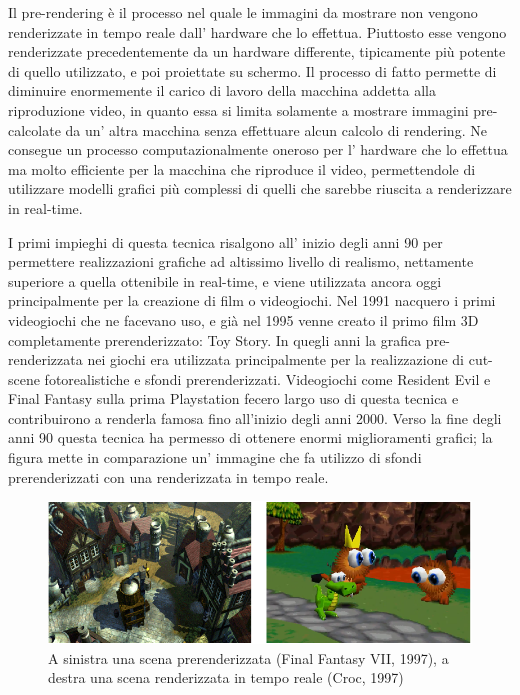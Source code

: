 Il pre-rendering è il processo nel quale le immagini da mostrare non vengono renderizzate in tempo reale dall’ hardware che lo effettua. Piuttosto esse vengono renderizzate precedentemente da un hardware differente, tipicamente più potente di quello utilizzato, e poi proiettate su schermo.
Il processo di fatto permette di diminuire enormemente il carico di lavoro della macchina addetta alla riproduzione video, in quanto essa si limita solamente a mostrare immagini pre-calcolate da un’ altra macchina senza effettuare alcun calcolo di rendering.
Ne consegue un processo computazionalmente oneroso per l’ hardware che lo effettua ma molto efficiente per la macchina che riproduce il video, permettendole di utilizzare modelli grafici più complessi di quelli che sarebbe riuscita a renderizzare in real-time.

I primi impieghi di questa tecnica risalgono all’ inizio degli anni 90 per permettere realizzazioni grafiche ad altissimo livello di realismo, nettamente superiore a quella ottenibile in real-time, e viene utilizzata ancora oggi principalmente per la creazione di film o videogiochi.
Nel 1991 nacquero i primi videogiochi che ne facevano uso, e già nel 1995 venne creato il primo film 3D completamente prerenderizzato: Toy Story.
In quegli anni la grafica pre-renderizzata nei giochi era utilizzata principalmente per la realizzazione di cut-scene fotorealistiche e sfondi prerenderizzati. 
Videogiochi come Resident Evil e Final Fantasy sulla prima Playstation fecero largo uso di questa tecnica e contribuirono a renderla famosa fino all’inizio degli anni 2000. 
Verso la fine degli anni 90 questa tecnica ha permesso di ottenere enormi miglioramenti grafici; la figura mette in comparazione un’ immagine che fa utilizzo di sfondi prerenderizzati con una renderizzata in tempo reale.
\\
\begin{figure}[htb]
 \centering
 \includegraphics[width=1\linewidth]{images/chapter_stato_arte/stato_arte_croc_ffvii.png}\hfill
 \caption[Confronto tra scena prerenderizzata e real time]{A sinistra una scena prerenderizzata (Final Fantasy VII, 1997), a destra una scena renderizzata in tempo reale (Croc, 1997)}
 \label{fig:stato_arte_confronto_ffvii_croc}
\end{figure}

